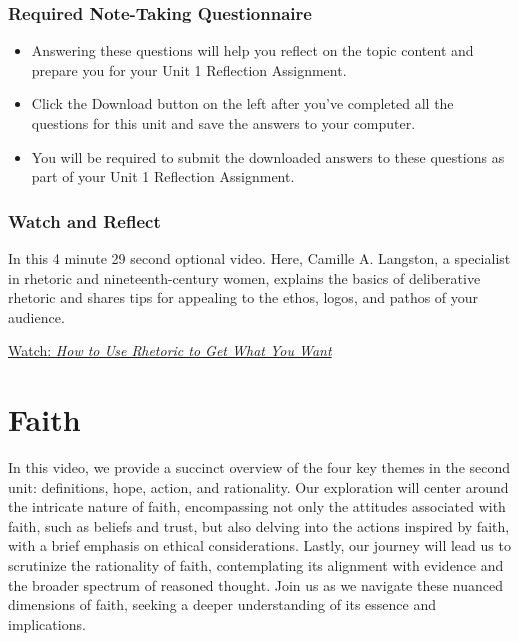 \documentclass[
]{book}
\providecommand{\tightlist}{%
  \setlength{\itemsep}{0pt}\setlength{\parskip}{0pt}}
\begin{document}
\hypertarget{required-note-taking-questionnaire-3}{%
\subsection*{Required Note-Taking Questionnaire}\label{required-note-taking-questionnaire-3}}

\begin{reflect}
\begin{itemize}
\tightlist
\item
  Answering these questions will help you reflect on the topic content and prepare you for your Unit 1 Reflection Assignment.\\
\item
  Click the Download button on the left after you've completed all the questions for this unit and save the answers to your computer.\\
\item
  You will be required to submit the downloaded answers to these questions as part of your Unit 1 Reflection Assignment.
\end{itemize}
\end{reflect}

\hypertarget{watch-and-reflect-7}{%
\subsection*{Watch and Reflect}\label{watch-and-reflect-7}}

\begin{reflect}
In this 4 minute 29 second optional video. Here, Camille A. Langston, a specialist in rhetoric and nineteenth-century women, explains the basics of deliberative rhetoric and shares tips for appealing to the ethos, logos, and pathos of your audience.

\href{https://www.youtube.com/watch?v=3klMM9BkW5o}{Watch: \emph{How to Use Rhetoric to Get What You Want}}
\end{reflect}

\hypertarget{faith}{%
\chapter{Faith}\label{faith}}

In this video, we provide a succinct overview of the four key themes in the second unit: definitions, hope, action, and rationality. Our exploration will center around the intricate nature of faith, encompassing not only the attitudes associated with faith, such as beliefs and trust, but also delving into the actions inspired by faith, with a brief emphasis on ethical considerations. Lastly, our journey will lead us to scrutinize the rationality of faith, contemplating its alignment with evidence and the broader spectrum of reasoned thought. Join us as we navigate these nuanced dimensions of faith, seeking a deeper understanding of its essence and implications.
\end{document}
